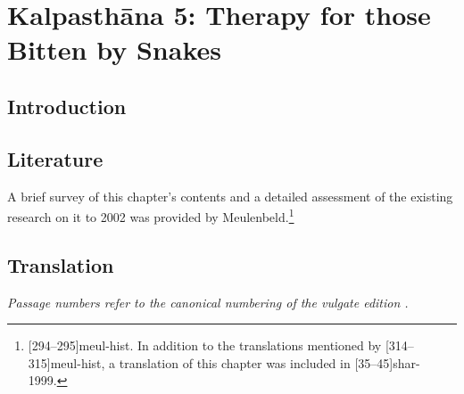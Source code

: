    
\chapter{Kalpasthāna 5: Therapy for those Bitten by Snakes}

\section{Introduction} 

\section{Literature}

A brief survey of this chapter's contents and a detailed assessment of
the existing research on it to 2002 was provided by
Meulenbeld.\footnote{[294--295]{meul-hist}. In addition to the
    translations mentioned by [314--315]{meul-hist}, a translation
    of this chapter was included in [35--45]{shar-1999}.} 
    
    
    \newpage
    
\section{Translation}

\emph{Passage numbers refer to the canonical numbering of the vulgate edition  
\citep{vulgate}.
}

